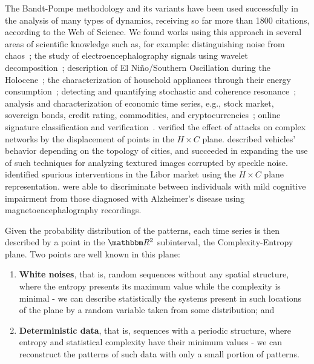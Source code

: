The Bandt-Pompe methodology and its variants have been used successfully in the analysis of many types of dynamics, receiving so far more than \num{1800} citations, according to the Web of Science.
We found works using this approach in several areas of scientific knowledge such as, for example:
distinguishing noise from chaos~\citep{rosso2007distinguishing};
the study of electroencephalography signals using wavelet decomposition~\citep{baravalle2018discriminating,baravalle2018rhythmic};
description of El Niño/Southern Oscillation during the Holocene~\citep{saco2010entropy};
the characterization of household appliances through their energy consumption~\citep{CharacterizationElectricLoadInformationTheoryQuantifiers};
detecting and quantifying stochastic and coherence resonance~\citep{rosso2009detectinga, rosso2009detectingb};
analysis and characterization of economic time series, e.g., stock market, sovereign bonds, credit rating, commodities, and cryptocurrencies~\citep{zunino2010complexity, zunino2012efficiency, bariviera2013efficiency, bariviera2018analysis, Araujo2019permutation};
online signature classification and verification~\citep{ClassificationVerificationOnlineHandwrittenSignatures}.
\cite{InformationTheoryPerspectiveNetworkRobustness} verified the effect of attacks on complex networks by the displacement of points in the $H \times C$ plane.
\citet{CharacterizationVehicleBehaviorInformationTheory} described vehicles' behavior depending on the topology of cities, and
\citet{Chagas2020Characterization} succeeded in expanding the use of such techniques for analyzing textured images corrupted by speckle noise.
\citet{LiborInvisibleHand} identified spurious interventions in the Libor market using the $H\times C$ plane representation.
\citet{echegoyen2020permutation} were able to discriminate between individuals with mild cognitive impairment from those diagnosed with Alzheimer's disease using magnetoencephalography recordings.

Given the probability distribution of the patterns, each time series is then described by a point in the $\mathbbm R^2$ subinterval, the Complexity-Entropy plane.
Two points are well known in this plane:
\begin{enumerate}
    \item \textbf{White noises}, that is, random sequences without any spatial structure, where the entropy presents its maximum value while the complexity is minimal - we can describe statistically the systems present in such locations of the plane by a random variable taken from some distribution; and
    \item \textbf{Deterministic data}, that is, sequences with a periodic structure, where entropy and statistical complexity have their minimum values - we can reconstruct the patterns of such data with only a small portion of patterns.
\end{enumerate}

